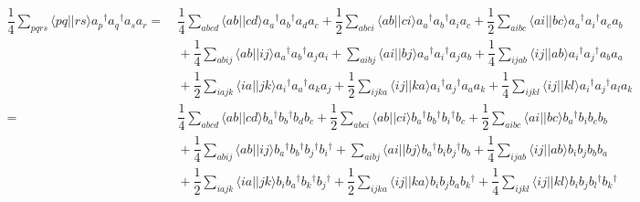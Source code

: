 \documentclass[11pt,fleqn]{article}
\newcommand{\dg}{\ensuremath{^\dagger}}
\newcommand{\fr}[2]{\ensuremath{\dfrac{#1}{#2}}}
\newcommand{\ip}[1]{\ensuremath{\langle#1\rangle}}
\theoremstyle{mystyle}
\numberwithin{equation}{section}
\begin{document}
\begin{align*}
  \fr{1}{4}
  \sum_{pqrs}
  \ip{pq||rs}
  a_p\dg a_q\dg a_sa_r
=&\
  \fr{1}{4}
  \sum_{abcd}
  \ip{ab||cd}
  a_a\dg a_b\dg a_da_c
+
  \fr{1}{2}
  \sum_{abci}
  \ip{ab||ci}
  a_a\dg a_b\dg a_ia_c
+
  \fr{1}{2}
  \sum_{aibc}
  \ip{ai||bc}
  a_a\dg a_i\dg a_ca_b
\\&\
+
  \fr{1}{4}
  \sum_{abij}
  \ip{ab||ij}
  a_a\dg a_b\dg a_ja_i
+
  \sum_{aibj}
  \ip{ai||bj}
  a_a\dg a_i\dg a_ja_b
+
  \fr{1}{4}
  \sum_{ijab}
  \ip{ij||ab}
  a_i\dg a_j\dg a_ba_a
\\&\
+
  \fr{1}{2}
  \sum_{iajk}
  \ip{ia||jk}
  a_i\dg a_a\dg a_ka_j
+
  \fr{1}{2}
  \sum_{ijka}
  \ip{ij||ka}
  a_i\dg a_j\dg a_aa_k
+
  \fr{1}{4}
  \sum_{ijkl}
  \ip{ij||kl}
  a_i\dg a_j\dg a_la_k
\\=&\
  \fr{1}{4}
  \sum_{abcd}
  \ip{ab||cd}
  b_a\dg b_b\dg b_db_c
+
  \fr{1}{2}
  \sum_{abci}
  \ip{ab||ci}
  b_a\dg b_b\dg b_i\dg b_c
+
  \fr{1}{2}
  \sum_{aibc}
  \ip{ai||bc}
  b_a\dg b_ib_cb_b
\\&\
+
  \fr{1}{4}
  \sum_{abij}
  \ip{ab||ij}
  b_a\dg b_b\dg b_j\dg b_i\dg
+
  \sum_{aibj}
  \ip{ai||bj}
  b_a\dg b_i b_j\dg b_b
+
  \fr{1}{4}
  \sum_{ijab}
  \ip{ij||ab}
  b_i b_j b_bb_a
\\&\
+
  \fr{1}{2}
  \sum_{iajk}
  \ip{ia||jk}
  b_i b_a\dg b_k\dg b_j\dg
+
  \fr{1}{2}
  \sum_{ijka}
  \ip{ij||ka}
  b_ib_jb_ab_k\dg
+
  \fr{1}{4}
  \sum_{ijkl}
  \ip{ij||kl}
  b_ib_jb_l\dg b_k\dg
\end{align*}
\end{document}
